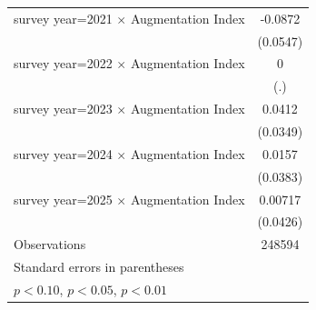 \begin{table}[htbp]
\begin{tabular}{l*{1}{c}}
survey year=2021 $\times$ Augmentation Index&     -0.0872         \\
                    &    (0.0547)         \\
\addlinespace
survey year=2022 $\times$ Augmentation Index&           0         \\
                    &         (.)         \\
\addlinespace
survey year=2023 $\times$ Augmentation Index&      0.0412         \\
                    &    (0.0349)         \\
\addlinespace
survey year=2024 $\times$ Augmentation Index&      0.0157         \\
                    &    (0.0383)         \\
\addlinespace
survey year=2025 $\times$ Augmentation Index&     0.00717         \\
                    &    (0.0426)         \\
\midrule
Observations        &      248594         \\
\bottomrule
\multicolumn{2}{l}{\footnotesize Standard errors in parentheses}\\
\multicolumn{2}{l}{\footnotesize \sym{*} \(p<0.10\), \sym{**} \(p<0.05\), \sym{***} \(p<0.01\)}\\
\end{tabular}
\end{table}
